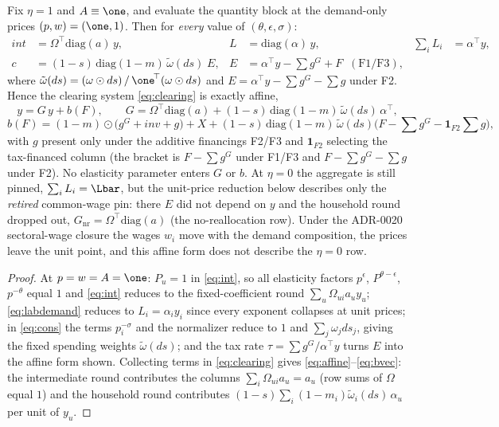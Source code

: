 \begin{lemma}\label{lem:affine}
Fix $\eta = 1$ and $A \equiv \one$, and evaluate the quantity block at the
demand-only prices $(p,w) = (\one,1)$. Then for \emph{every} value of
$(\theta,\epsilon,\sigma)$:
\begin{align}
int &= \Omega^{\!\top}\mathrm{diag}(a)\, y, &
L &= \mathrm{diag}(\alpha)\, y, &
\sum_i L_i &= \alpha^{\!\top} y,
\label{eq:leontiefblocks}\\
c &= (1-s)\,\mathrm{diag}(1-m)\,\tilde\omega(ds)\; E, &
E &= \alpha^{\!\top} y - \textstyle\sum g^G + F
   \;\; (\text{F1/F3}), \nonumber
\end{align}
where $\tilde\omega(ds) = (\omega \odot ds)\,/\, \one^{\!\top}(\omega \odot
ds)$ and $E = \alpha^{\!\top} y - \sum g^G - \sum g$ under F2. Hence the
clearing system \eqref{eq:clearing} is exactly affine,
\begin{equation}
y = G\, y + b(F),
\qquad
G = \Omega^{\!\top}\mathrm{diag}(a)
  + (1-s)\,\mathrm{diag}(1-m)\,\tilde\omega(ds)\,\alpha^{\!\top},
\label{eq:affine}
\end{equation}
\begin{equation}
b(F) = (1-m)\odot\big( g^G + inv + g \big) + X
     + (1-s)\,\mathrm{diag}(1-m)\,\tilde\omega(ds)
       \big( F - \textstyle\sum g^G - \mathbf{1}_{F2}\textstyle\sum g \big),
\label{eq:bvec}
\end{equation}
with $g$ present only under the additive financings
F2/F3 and $\mathbf{1}_{F2}$ selecting the tax-financed column (the bracket is
$F-\sum g^G$ under F1/F3 and $F-\sum g^G-\sum g$ under F2).
No elasticity parameter enters $G$ or $b$. At
$\eta = 0$ the aggregate is still pinned, $\sum_i L_i = \Lbar$, but the
unit-price reduction below describes only the \emph{retired} common-wage
pin: there $E$ did not depend on $y$ and the household round dropped out,
$G_{\mathrm{nr}} = \Omega^{\!\top}\mathrm{diag}(a)$ (the no-reallocation
row). Under the ADR-0020 sectoral-wage
closure the wages $w_i$ move with the demand composition, the prices leave
the unit point, and this affine form does not describe the $\eta = 0$ row.
\end{lemma}

\begin{proof}
At $p = w = A = \one$: $P_u = 1$ in \eqref{eq:int}, so all elasticity
factors $p^{\epsilon}$, $P^{\theta-\epsilon}$, $p^{-\theta}$ equal $1$ and
\eqref{eq:int} reduces to the fixed-coefficient round
$\sum_u \Omega_{ui} a_u y_u$; \eqref{eq:labdemand} reduces to
$L_i = \alpha_i y_i$ since every exponent collapses at unit prices; in
\eqref{eq:cons} the terms $p_i^{-\sigma}$ and the normalizer reduce to
$1$ and $\sum_j \omega_j ds_j$, giving the fixed spending weights
$\tilde\omega(ds)$; and the tax rate $\tau = \sum g^G / \alpha^{\!\top}y$
turns $E$ into the affine form shown. Collecting terms in
\eqref{eq:clearing} gives \eqref{eq:affine}--\eqref{eq:bvec}: the
intermediate round contributes the columns
$\sum_i \Omega_{ui} a_u = a_u$ (row sums of $\Omega$ equal $1$) and the
household round contributes $(1-s)\sum_i (1-m_i)\tilde\omega_i(ds)\,
\alpha_u$ per unit of $y_u$.
\end{proof}

